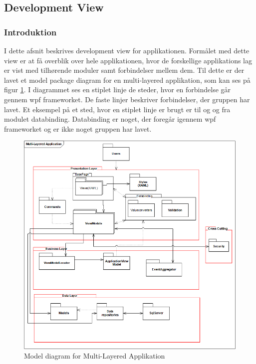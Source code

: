 \documentclass[Arkitektur/System_main.tex]{subfiles}
\begin{document}
\subsection{Development View}
\subsubsection{Introduktion}
I dette afsnit beskrives development view for applikationen. Formålet med dette view er at få overblik over hele applikationen, hvor de forskellige applikations lag er vist med tilhørende moduler samt forbindelser mellem dem. Til dette er der lavet et model package diagram for en multi-layered applikation, som kan ses på figur \ref{fig:PackageDiagram}. I diagrammet ses en stiplet linje de steder, hvor en forbindelse går gennem wpf frameworket. De faste linjer beskriver forbindelser, der gruppen har lavet. Et eksempel på et sted, hvor en stiplet linje er brugt er til og og fra modulet databinding. Databinding er noget, der foregår igennem wpf frameworket og er ikke noget gruppen har lavet.

\begin{figure}[H]
    \centering
    \includegraphics[width=\textwidth]{Arkitektur/4+1View/Graphics/PackageDiagram.png}
    \caption{Model diagram for Multi-Layered Applikation}
    \label{fig:PackageDiagram}
\end{figure}
\end{document}
